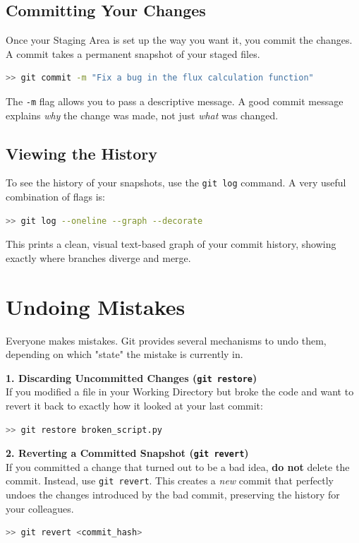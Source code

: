 \subsection{Committing Your Changes}
Once your Staging Area is set up the way you want it, you commit the changes. A commit takes a permanent snapshot of your staged files.
\begin{lstlisting}[language=bash]
>> git commit -m "Fix a bug in the flux calculation function"
\end{lstlisting}
The \texttt{-m} flag allows you to pass a descriptive message. A good commit message explains \textit{why} the change was made, not just \textit{what} was changed.

\subsection{Viewing the History}
To see the history of your snapshots, use the \texttt{git log} command. A very useful combination of flags is:
\begin{lstlisting}[language=bash]
>> git log --oneline --graph --decorate
\end{lstlisting}
This prints a clean, visual text-based graph of your commit history, showing exactly where branches diverge and merge.

\section{Undoing Mistakes}
Everyone makes mistakes. Git provides several mechanisms to undo them, depending on which "state" the mistake is currently in.

\textbf{1. Discarding Uncommitted Changes (\texttt{git restore})} \\
If you modified a file in your Working Directory but broke the code and want to revert it back to exactly how it looked at your last commit:
\begin{lstlisting}[language=bash]
>> git restore broken_script.py
\end{lstlisting}

\textbf{2. Reverting a Committed Snapshot (\texttt{git revert})} \\
If you committed a change that turned out to be a bad idea, \textbf{do not} delete the commit. Instead, use \texttt{git revert}. This creates a \textit{new} commit that perfectly undoes the changes introduced by the bad commit, preserving the history for your colleagues.
\begin{lstlisting}[language=bash]
>> git revert <commit_hash>
\end{lstlisting}

